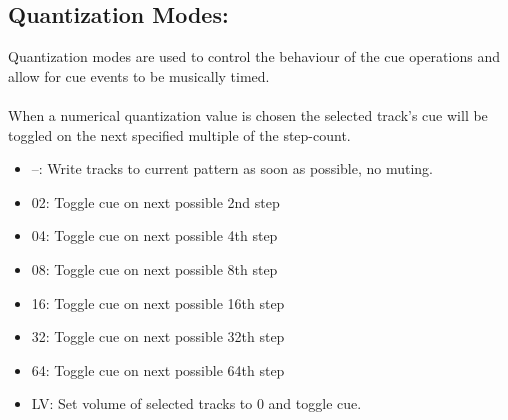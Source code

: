 \subsection{Quantization Modes:}
 Quantization modes are used to control the behaviour of the cue operations and allow for cue events to be musically timed.\\
 \\
 When a numerical quantization value is chosen the selected track’s cue will be toggled on the next specified multiple of the step-count.
 \begin{itemize}
\item --: Write tracks to current pattern as soon as possible, no muting.
\item 02: Toggle cue on next possible 2nd step
\item 04: Toggle cue on next possible 4th step
\item 08: Toggle cue on next possible 8th step 
\item 16: Toggle cue on next possible 16th step 
\item 32: Toggle cue on next possible 32th step 
\item 64: Toggle cue on next possible 64th step
\item LV: Set volume of selected tracks to 0 and toggle cue.
 \end{itemize}
 
 